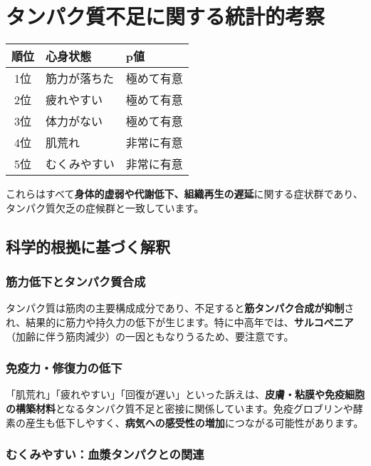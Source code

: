 \documentclass[a4paper,12pt]{article}
\begin{document}
\section{タンパク質不足に関する統計的考察}
\begin{table}[H]
\centering
\begin{tabular}{|c|l|l|}
\hline
順位 & 心身状態 & p値 \\
\hline
1位 & 筋力が落ちた & 極めて有意 \\
2位 & 疲れやすい & 極めて有意 \\
3位 & 体力がない & 極めて有意 \\
4位 & 肌荒れ & 非常に有意 \\
5位 & むくみやすい & 非常に有意 \\
\hline
\end{tabular}
\end{table}

これらはすべて\textbf{身体的虚弱や代謝低下、組織再生の遅延}に関する症状群であり、タンパク質欠乏の症候群と一致しています。

\subsection*{科学的根拠に基づく解釈}

\subsubsection*{筋力低下とタンパク質合成}

タンパク質は筋肉の主要構成成分であり、不足すると\textbf{筋タンパク合成が抑制}され、結果的に筋力や持久力の低下が生じます。特に中高年では、\textbf{サルコペニア}（加齢に伴う筋肉減少）の一因ともなりうるため、要注意です。

\subsubsection*{免疫力・修復力の低下}

「肌荒れ」「疲れやすい」「回復が遅い」といった訴えは、\textbf{皮膚・粘膜や免疫細胞の構築材料}となるタンパク質不足と密接に関係しています。免疫グロブリンや酵素の産生も低下しやすく、\textbf{病気への感受性の増加}につながる可能性があります。

\subsubsection*{むくみやすい：血漿タンパクとの関連}
\end{document}
